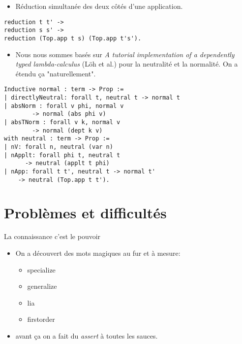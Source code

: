\documentclass{beamer}
\begin{document}
\begin{frame}[fragile]
\begin{itemize}
\item Réduction simultanée des deux côtés d'une application.
\pause
\end{itemize}
\begin{verbatim}
reduction t t' ->
reduction s s' ->
reduction (Top.app t s) (Top.app t's').
\end{verbatim}
\pause
\begin{itemize}
\item Nous nous sommes basés sur \emph{A tutorial implementation of a
dependently typed lambda-calculus} (Löh et al.) pour la neutralité et la
normalité. On a étendu ça "naturellement".
\end{itemize}
\end{frame}

\begin{frame}[fragile]
\begin{verbatim}
Inductive normal : term -> Prop :=
| directlyNeutral: forall t, neutral t -> normal t
| absNorm : forall v phi, normal v 
		-> normal (abs phi v)
| absTNorm : forall v k, normal v 
		-> normal (dept k v)
with neutral : term -> Prop :=
| nV: forall n, neutral (var n)
| nApplt: forall phi t, neutral t 
	  -> neutral (applt t phi)
| nApp: forall t t', neutral t -> normal t' 
	-> neutral (Top.app t t').
\end{verbatim}
\end{frame}

\section{Problèmes et difficultés}

\begin{frame}{La connaissance c'est le pouvoir}
\begin{itemize}
\item On a découvert des mots magiques au fur et à mesure:
\pause
\begin{itemize}
\item specialize
\item generalize
\item lia
\item firstorder
\end{itemize}
\pause
\item avant ça on a fait du \emph{assert} à toutes les sauces.
\end{itemize}
\end{frame}
\end{document}
